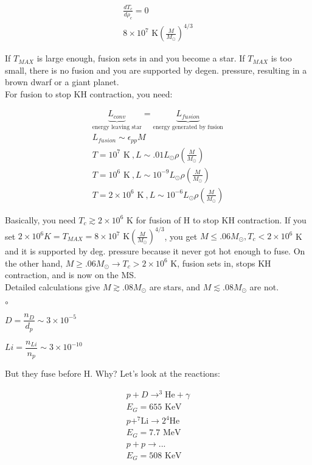 \documentclass[10pt,letterpaper,final]{book}
\newcommand{\rp}{\right)}
\newcommand{\lp}{\left(}
\newcommand{\mfrac}{\lp \frac{M}{M_\odot}\rp}
\newcommand{\ra}{\rightarrow}
\begin{document}
\begin{align}
\frac{dT_c}{d\rho_c} = 0\\
8 \times 10^7 \text{ K} \mfrac^{4/3}
\end{align}

If $T_{MAX}$ is large enough, fusion sets in and you become a star. If $T_{MAX}$ is too small, there is no fusion and you are supported by degen. pressure, resulting in a brown dwarf or a giant planet. \\

For fusion to stop KH contraction, you need:

\begin{align}
\underbrace{L_{conv}}_{\text{energy leaving star}} = \underbrace{L_{fusion}}_{\text{energy generated by fusion}}\\
L_{fusion} \sim \epsilon_{pp}M\\
T = 10^7 \text{ K}~, L \sim .01 L_\odot \rho \mfrac\\
T = 10^6 \text{ K}~, L \sim 10^{-9} L_\odot \rho \mfrac\\
T = 2 \times 10^6 \text{ K}~, L \sim 10^{-6} L_\odot \rho \mfrac
\end{align}

Basically, you need $T_c \gtrsim 2 \times 10^6$ K for fusion of H to stop KH contraction. If you set $2 \times 10^6 K = T_{MAX} = 8 \times10^7 \text{ K} \mfrac^{4/3}$, you get $M \leq .06 M_\odot, T_c < 2 \times 10^6 $ K and it is supported by deg. pressure because it never got hot enough to fuse. On the other hand, $M \geq .06 M_\odot \ra T_c > 2 \times 10^6$ K, fusion sets in, stops KH contraction, and is now on the MS. \\

Detailed calculations give $M \gtrsim .08 M_\odot$ are stars, and $M \lesssim .08 M_\odot$ are not. 

%
%

\begin{list}{$\circ$}{}
\item $D= \dfrac{n_D}{d_p} \sim 3 \times 10^{-5}$
\item $Li = \dfrac{n_{Li}}{n_p} \sim 3 \times 10^{-10}$
\end{list}

But they fuse before H. Why? Let's look at the reactions:

\begin{align}
p + D \ra ^3\text{He} + \gamma\\
E_G = 655 \text{ KeV}\\
p + ^7\text{Li} \ra 2 ^4\text{He}\\
E_G = 7.7 \text{ MeV}\\
p + p \ra ...\\
E_G = 508 \text{ KeV}
\end{align}
\end{document}
